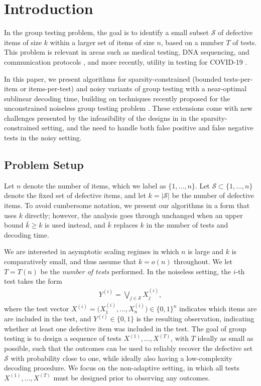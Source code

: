 \vspace*{-2ex}
\section{Introduction}

In the group testing problem, the goal is to identify a small subset $\mathcal{S}$ of defective items of size $k$ within a larger set of items of size $n$, based on a number $T$ of tests. This problem is relevant in areas such as medical testing, DNA sequencing, and communication protocols \cite[Sec.~1.7]{Ald19}, and more recently, utility in testing for COVID-19 \cite{Hogan2020,Yelin2020}.

In this paper, we present algorithms for sparsity-constrained (bounded tests-per-item or items-per-test) and noisy variants of group testing with a near-optimal sublinear decoding time, building on techniques recently proposed for the unconstrained noiseless group testing problem \cite{cher20,Eri20}. %
These extensions come with new challenges presented by the infeasibility of the designs in \cite{cher20,Eri20} in the sparsity-constrained setting, and the need to handle both false positive and false negative tests in the noisy setting.

\subsection{Problem Setup}

Let $n$ denote the number of items, which we label as $\{1,\dots,n\}$. Let $\mathcal{S}\subset\{1,\dots,n\}$ denote the fixed set of defective items, and let $k=|\mathcal{S}|$ be the number of defective items.  To avoid cumbersome notation, we present our algorithms in a form that uses $k$ directly; however, the analysis goes through unchanged when an upper bound $\bar{k} \ge k$ is used instead, and $\bar{k}$ replaces $k$ in the number of tests and decoding time.

We are interested in asymptotic scaling regimes in which $n$ is large and $k$ is comparatively small, and thus assume that $k=o(n)$ throughout. We let $T=T(n)$ be the \textit{number of tests} performed. In the noiseless setting, the $i$-th test takes the form 
\begin{align}
    Y^{(i)}=\bigvee_{j\in\mathcal{S}}X_j^{(i)}, \label{eq:test_outcome_formula}
\end{align}
where the test vector $X^{(i)}=\big(X_1^{(i)},\dots,X_n^{(i)}\big)\in\{0,1\}^n$ indicates which items are are included in the test, and $Y^{(i)}\in\{0,1\}$ is the resulting observation, indicating whether at least one defective item was included in the test. The goal of group testing is to design a sequence of tests $X^{(1)},\dots,X^{(T)}$, with $T$ ideally as small as possible, such that the outcomes can be used to reliably recover the defective set $\mathcal{S}$ with probability close to one, while ideally also having a low-complexity decoding procedure. We focus on the non-adaptive setting, in which all tests $X^{(1)},\dots,X^{(T)}$ must be designed prior to observing any outcomes.

